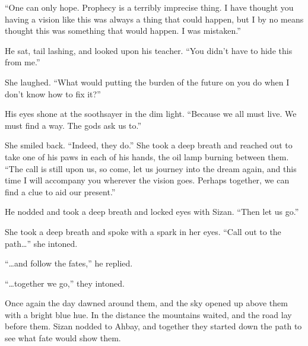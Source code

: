 ``One can only hope. Prophecy is a terribly imprecise thing. I have thought you having a vision like this was always a thing that could happen, but I by no means thought this was something that would happen. I was mistaken.''

He sat, tail lashing, and looked upon his teacher. ``You didn't have to hide this from me.''

She laughed. ``What would putting the burden of the future on you do when I don't know how to fix it?''

His eyes shone at the soothsayer in the dim light. ``Because we all must live. We must find a way. The gods ask us to.''

She smiled back. ``Indeed, they do.'' She took a deep breath and reached out to take one of his paws in each of his hands, the oil lamp burning between them. ``The call is still upon us, so come, let us journey into the dream again, and this time I will accompany you wherever the vision goes. Perhaps together, we can find a clue to aid our present.''

He nodded and took a deep breath and locked eyes with Sizan. ``Then let us go.''

She took a deep breath and spoke with a spark in her eyes. ``Call out to the path\ldots'' she intoned.

``\ldots and follow the fates,'' he replied.

``\ldots together we go,'' they intoned.

Once again the day dawned around them, and the sky opened up above them with a bright blue hue. In the distance the mountains waited, and the road lay before them. Sizan nodded to Ahbay, and together they started down the path to see what fate would show them.
